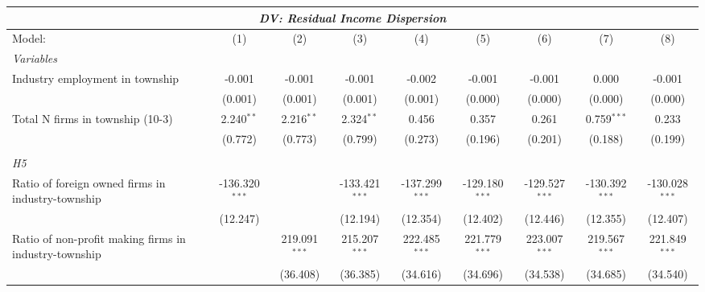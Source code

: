 \begingroup
\centering
\begin{tabular}{lcccccccc}
   \tabularnewline \multicolumn{9}{c}{\textit{DV: Residual Income Dispersion}} \\ \midrule \midrule
   Model:                                                & (1)              & (2)             & (3)              & (4)              & (5)              & (6)              & (7)              & (8)\\  
   \midrule
   \emph{Variables}\\
   Industry employment in township                       & -0.001           & -0.001          & -0.001           & -0.002           & -0.001           & -0.001           & 0.000            & -0.001\\   
                                                         & (0.001)          & (0.001)         & (0.001)          & (0.001)          & (0.000)          & (0.000)          & (0.000)          & (0.000)\\   
   Total N firms in township (10-3)                      & 2.240$^{**}$     & 2.216$^{**}$    & 2.324$^{**}$     & 0.456            & 0.357            & 0.261            & 0.759$^{***}$    & 0.233\\   
                                                         & (0.772)          & (0.773)         & (0.799)          & (0.273)          & (0.196)          & (0.201)          & (0.188)          & (0.199)\\   
\hdashline %
\\[0.1ex] %
\emph{H5} \\ 
   Ratio of foreign owned firms in industry-township     & -136.320$^{***}$ &                 & -133.421$^{***}$ & -137.299$^{***}$ & -129.180$^{***}$ & -129.527$^{***}$ & -130.392$^{***}$ & -130.028$^{***}$\\   
                                                         & (12.247)         &                 & (12.194)         & (12.354)         & (12.402)         & (12.446)         & (12.355)         & (12.407)\\   
   Ratio of non-profit making firms in industry-township &                  & 219.091$^{***}$ & 215.207$^{***}$  & 222.485$^{***}$  & 221.779$^{***}$  & 223.007$^{***}$  & 219.567$^{***}$  & 221.849$^{***}$\\   
                                                         &                  & (36.408)        & (36.385)         & (34.616)         & (34.696)         & (34.538)         & (34.685)         & (34.540)\\   

\end{tabular}

